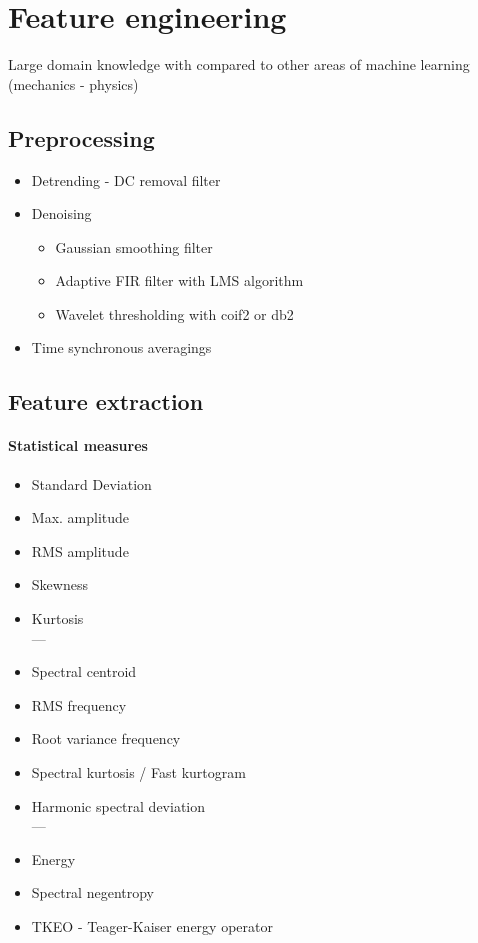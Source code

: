 \section{Feature engineering}
Large domain knowledge with compared to other areas of machine learning (mechanics - physics)
\subsection{Preprocessing}
\begin{itemize}
\item Detrending - DC removal filter
\item Denoising 
	\begin{itemize}
	\item Gaussian smoothing filter 
	\item Adaptive FIR filter with LMS algorithm
	\item Wavelet thresholding with coif2 or db2
	\end{itemize}
\item Time synchronous averagings
\end{itemize}

\subsection{Feature extraction}

\paragraph{Statistical measures}
\begin{itemize}
\item Standard Deviation
\item Max. amplitude
\item RMS amplitude
\item Skewness
\item Kurtosis \\
---
\item Spectral centroid
\item RMS frequency
\item Root variance frequency
\item Spectral kurtosis / Fast kurtogram
\item Harmonic spectral deviation \\
---
\item Energy
\item Spectral negentropy
\item TKEO - Teager-Kaiser energy operator
\end{itemize}

